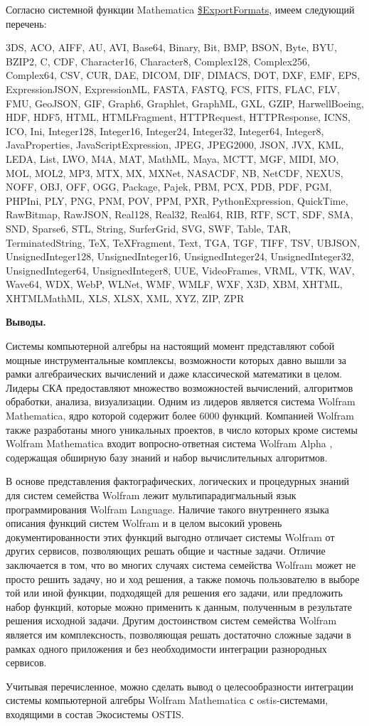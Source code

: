 Согласно системной функции Mathematica \underline{\$ExportFormats}, имеем следующий перечень: 

{3DS, ACO, AIFF, AU, AVI, Base64, Binary, Bit, BMP, BSON, Byte, BYU, BZIP2, C, CDF, Character16, Character8, Complex128, Complex256, Complex64, CSV, CUR, DAE, DICOM, DIF, DIMACS, DOT, DXF, EMF, EPS, ExpressionJSON, ExpressionML, FASTA, FASTQ, FCS, FITS, FLAC, FLV, FMU, GeoJSON, GIF, Graph6, Graphlet, GraphML, GXL, GZIP, HarwellBoeing, HDF, HDF5, HTML, HTMLFragment, HTTPRequest, HTTPResponse, ICNS, ICO, Ini, Integer128, Integer16, Integer24, Integer32, Integer64, Integer8, JavaProperties, JavaScriptExpression, JPEG, JPEG2000, JSON, JVX, KML, LEDA, List, LWO, M4A, MAT, MathML, Maya, MCTT, MGF, MIDI, MO, MOL, MOL2, MP3, MTX, MX, MXNet, NASACDF, NB, NetCDF, NEXUS, NOFF, OBJ, OFF, OGG, Package, Pajek, PBM, PCX, PDB, PDF, PGM, PHPIni, PLY, PNG, PNM, POV, PPM, PXR, PythonExpression, QuickTime, RawBitmap, RawJSON, Real128, Real32, Real64, RIB, RTF, SCT, SDF, SMA, SND, Sparse6, STL, String, SurferGrid, SVG, SWF, Table, TAR, TerminatedString, TeX, TeXFragment, Text, TGA, TGF, TIFF, TSV, UBJSON, UnsignedInteger128, UnsignedInteger16, UnsignedInteger24, UnsignedInteger32, UnsignedInteger64, UnsignedInteger8, UUE, VideoFrames, VRML, VTK, WAV, Wave64, WDX, WebP, WLNet, WMF, WMLF, WXF, X3D, XBM, XHTML, XHTMLMathML, XLS, XLSX, XML, XYZ, ZIP, ZPR}

\textbf{Выводы.}

Системы компьютерной алгебры на настоящий момент представляют собой мощные инструментальные комплексы, возможности которых давно вышли за рамки алгебраических вычислений и даже классической математики в целом. Лидеры СКА предоставляют множество возможностей вычислений, алгоритмов обработки, анализа, визуализации. Одним из лидеров является система Wolfram Mathematica, ядро которой содержит более 6000 функций. Компанией Wolfram также разработаны много уникальных проектов, в число которых кроме системы Wolfram Mathematica входит вопросно-ответная система Wolfram Alpha \cite{WolframAlpha}, содержащая обширную базу знаний и набор вычислительных алгоритмов. 

В основе представления фактографических, логических и процедурных знаний для систем семейства Wolfram лежит мультипарадигмальный язык программирования Wolfram Language. Наличие такого внутреннего языка описания функций систем Wolfram и в целом высокий уровень документированности этих функций выгодно отличает системы Wolfram от других сервисов, позволяющих решать общие и частные задачи. Отличие заключается в том, что во многих случаях система семейства Wolfram может не просто решить задачу, но и  ход решения, а также помочь пользователю в выборе той или иной функции, подходящей для решения его задачи, или предложить набор функций, которые можно применить к данным, полученным в результате решения исходной задачи. Другим достоинством систем семейства Wolfram является им комплексность, позволяющая решать достаточно сложные задачи в рамках одного приложения и без необходимости интеграции разнородных сервисов.

Учитывая перечисленное, можно сделать вывод о целесообразности интеграции системы компьютерной алгебры Wolfram Mathematica с ostis-системами, входящими в состав Экосистемы OSTIS. 
